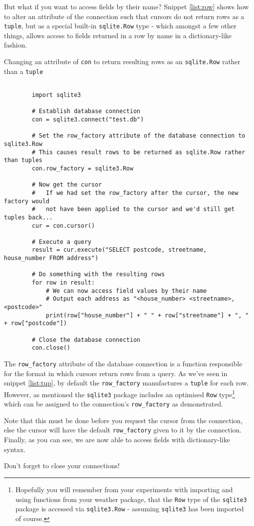 \documentclass[a4paper]{article}
\begin{document}
\pagebreak

But what if you want to access fields by their name? Snippet \ref{list:row} shows
how to alter an attribute of the connection such that cursors do not return rows
as a \texttt{tuple}, but as a special built-in \texttt{sqlite.Row} type - which
amongst a few other things, allows access to fields returned in a row by name in
a dictionary-like fashion.

\begin{listing}[H]
    \caption[]{Changing an attribute of \texttt{con} to return resulting rows as an \texttt{sqlite.Row} rather than a \texttt{tuple}}
    \label{list:row}
    \begin{verbatim}

        import sqlite3

        # Establish database connection
        con = sqlite3.connect("test.db")

        # Set the row_factory attribute of the database connection to sqlite3.Row
        # This causes result rows to be returned as sqlite.Row rather than tuples
        con.row_factory = sqlite3.Row

        # Now get the cursor
        #   If we had set the row_factory after the cursor, the new factory would
        #   not have been applied to the cursor and we'd still get tuples back...
        cur = con.cursor()

        # Execute a query
        result = cur.execute("SELECT postcode, streetname, house_number FROM address")

        # Do something with the resulting rows
        for row in result:
            # We can now access field values by their name
            # Output each address as "<house_number> <streetname>, <postcode>"
            print(row["house_number"] + " " + row["streetname"] + ", " + row["postcode"])

        # Close the database connection
        con.close()

    \end{verbatim}
\end{listing}

The \texttt{row\_factory} attribute of the database connection is a function
responsible for the format in which cursors return rows from a query. As we've seen
in snippet \ref{list:tup}, by default the \texttt{row\_factory}
manufactures a \texttt{tuple} for each row.
However, as mentioned the \texttt{sqlite3} package includes an
optimised \texttt{Row} type\footnote{Hopefully you will remember from your experiments
with importing and using functions from your weather package, that the \texttt{Row} type
of the \texttt{sqlite3} package is accessed via \texttt{sqlite3.Row} - assuming \texttt{sqlite3}
has been imported of course.} which can
be assigned to the connection's \texttt{row\_factory} as demonstrated.

Note that this must be done before you request the cursor from the connection,
else the cursor will have the default \texttt{row\_factory} given to it by the connection.
Finally, as you can see, we are now able to access fields with dictionary-like syntax.

Don't forget to close your connections!
\end{document}
